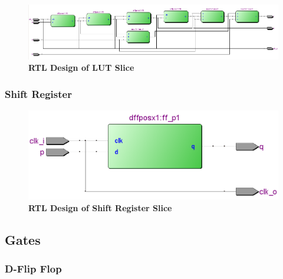 \documentclass[a4paper]{article}
\begin{document}
    

    \begin{figure}[H]
        \centering
        \includegraphics[width=\textwidth,height=\textheight,keepaspectratio]{../../docs/rtl_pics/lut_slice_rtl.png}
        \caption{\textbf{RTL Design of LUT Slice}}
        \label{fig:gg}
    \end{figure}

\subsubsection{\textbf{Shift Register}}

    

    \begin{figure}[H]
        \centering
        \includegraphics[width=\textwidth,height=\textheight,keepaspectratio]{../../docs/rtl_pics/shift_slice_rtl.png}
        \caption{\textbf{RTL Design of Shift Register Slice}}
        \label{fig:gg}
    \end{figure}

\subsection{\textbf{Gates}}
\subsubsection{\textbf{D-Flip Flop}}

    
\end{document}
